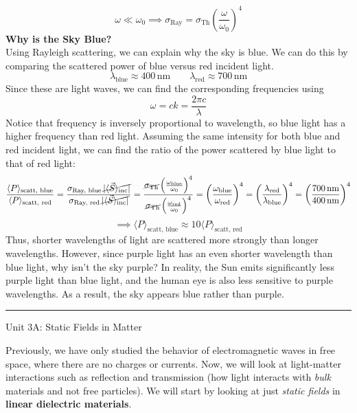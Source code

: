 \documentclass[12pt]{article}
\begin{document}
\[\omega \ll \omega_0 \implies \sigma_\text{Ray} = \sigma_\text{Th} \left(\frac{\omega}{\omega_0}\right)^4\]
\textbf{Why is the Sky Blue?}\\
Using Rayleigh scattering, we can explain why the sky is blue. We can do this by comparing the scattered power of blue versus red incident light. 
\[\lambda_{\text{blue}} \approx 400 \, \text{nm} \qquad \lambda_{\text{red}} \approx 700 \, \text{nm} \]
Since these are light waves, we can find the corresponding frequencies using 
\[\omega=ck=\frac{2\pi c}{\lambda}\]
Notice that frequency is inversely proportional to wavelength, so blue light has a higher frequency than red light. Assuming the same intensity for both blue and red incident light, we can find the ratio of the power scattered by blue light to that of red light:
\[\frac{\langle P \rangle_{\text{scatt, blue}}}{\langle P \rangle_{\text{scatt, red}}} = \frac{\sigma_{\text{Ray, blue}}\,\cancel{|\langle \vec{S} \rangle_{\text{inc}}|}}{\sigma_{\text{Ray, red}}\,\cancel{|\langle \vec{S} \rangle_{\text{inc}}|}} = \frac{\cancel{\sigma_{\text{Th}}} \left( \frac{\omega_{\text{blue}}}{\omega_0} \right)^4}{\cancel{\sigma_{\text{Th}}} \left( \frac{\omega_{\text{red}}}{\omega_0} \right)^4} = \left( \frac{\omega_{\text{blue}}}{\omega_{\text{red}}} \right)^4 = \left( \frac{\lambda_{\text{red}}}{\lambda_{\text{blue}}} \right)^4 = \left( \frac{700\,\text{nm}}{400\,\text{nm}} \right)^4 \]
\[\implies \langle P \rangle_{\text{scatt, blue}}\approx 10 \langle P \rangle_{\text{scatt, red}} \]
Thus, shorter wavelengths of light are scattered more strongly than longer wavelengths. However, since purple light has an even shorter wavelength than blue light, why isn't the sky purple? In reality, the Sun emits significantly less purple light than blue light, and the human eye is also less sensitive to purple wavelengths. As a result, the sky appears blue rather than purple.
\vspace{1em}
\noindent\hrule
\vspace{1em}
\newpage
\begin{center}
   {\LARGE Unit 3A: Static Fields in Matter\par} 
\end{center}
Previously, we have only studied the behavior of electromagnetic waves in free space, where there are no charges or currents. Now, we will look at light-matter interactions such as reflection and transmission (how light interacts with \textit{bulk} materials and not free particles). We will start by looking at just \textit{static fields} in \textbf{linear dielectric materials}.\\\\
\end{document}
